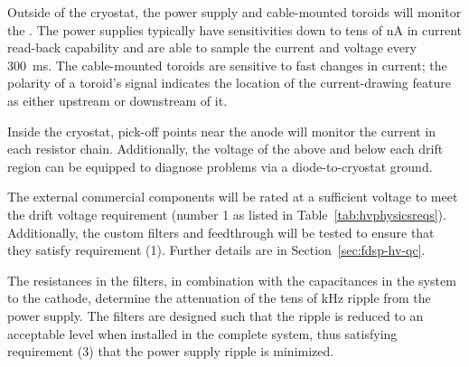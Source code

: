 
Outside of the cryostat, the power supply and cable-mounted toroids will monitor the .    The power supplies %
typically have sensitivities down to tens of \si{\nano\ampere} in current read-back capability 
 and are able to sample the current and voltage every \SI{300}{\ms}.  The cable-mounted toroids are sensitive to fast changes in current; %
the polarity of a toroid's signal %
indicates the location of the current-drawing feature as either upstream or downstream of it.

Inside the cryostat, pick-off points near the anode will monitor the current %
in each resistor chain.  Additionally, the voltage of the  above and below each drift region can be equipped to diagnose problems via a diode-to-cryostat ground.

The external commercial  components will be rated at a sufficient voltage to meet the drift voltage requirement (number 1 as listed in Table~\ref{tab:hvphysicsreqs}).  Additionally, the custom filters and feedthrough will be tested to %
ensure that they satisfy requirement (1).  Further details are in Section~\ref{sec:fdsp-hv-qc}.

The resistances in the filters, in combination with the capacitances in the  system to the cathode,
 determine the attenuation of the tens of \si{\kilo\hertz} ripple from the power supply.  The filters %
are designed such that the ripple is reduced to an acceptable level when installed in the complete system, thus satisfying requirement (3) that the power supply ripple is minimized.

